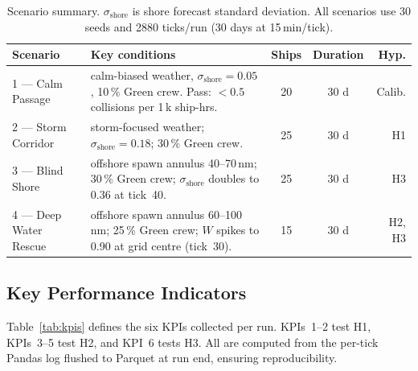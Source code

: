 \documentclass[cameraready]{Interspeech}
\begin{document}
\begin{table}[htbp]
    \caption{Scenario summary. $\sigma_\text{shore}$ is shore forecast standard deviation. All scenarios use 30 seeds and 2880 ticks/run (30 days at 15\,min/tick).}
    \label{tab:scenarios}
    \centering
    \small
    \begin{tabularx}{\textwidth}{@{}l>{\raggedright\arraybackslash}Xccr@{}}
        \toprule
        Scenario & Key conditions & Ships & Duration & Hyp. \\
        \midrule
        1 — Calm Passage &
        calm-biased weather, $\sigma_\text{shore}{=}0.05$, 10\,\% Green crew.
        Pass: ${<}0.5$ collisions per 1\,k ship-hrs. &
        20 & 30 d &
        Calib. \\[4pt]
        2 — Storm Corridor &
        storm-focused weather; $\sigma_\text{shore}{=}0.18$;
        30\,\% Green crew. &
        25 & 30 d &
        H1 \\[4pt]
        3 — Blind Shore &
        offshore spawn annulus 40--70\,nm; 30\,\% Green crew;
        $\sigma_\text{shore}$ doubles to $0.36$ at tick~40. &
        25 & 30 d &
        H3 \\[4pt]
        4 — Deep Water Rescue &
        offshore spawn annulus 60--100\,nm; 25\,\% Green crew;
        $W$ spikes to 0.90 at grid centre (tick~30). &
        15 & 30 d &
        H2, H3 \\
        \bottomrule
    \end{tabularx}
\end{table}

\subsection{Key Performance Indicators}

Table~\ref{tab:kpis} defines the six KPIs collected per run. KPIs~1--2 test H1, KPIs~3--5 test H2, and KPI~6 tests H3. All are computed from the per-tick Pandas log flushed to Parquet at run end, ensuring reproducibility.
\end{document}
